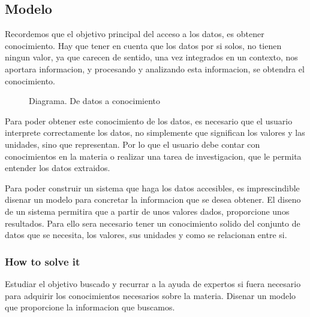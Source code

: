 \subsection{Modelo}

Recordemos que el objetivo principal del acceso a los datos, es obtener conocimiento. Hay que tener en 
cuenta que los datos por si solos, no tienen ningun valor, ya que carecen de sentido, una vez integrados en un contexto,
nos aportara informacion, y procesando y analizando esta informacion, se obtendra el conocimiento.\\
    
\begin{figure}[ht]
    \centering 
      \caption{Diagrama. De datos a conocimiento}
    \end{figure}
 
Para poder obtener este conocimiento de los datos, es necesario que el usuario interprete correctamente los datos, no
simplemente que significan los valores y las unidades, sino que representan. Por lo
que el usuario debe contar con conocimientos en la materia o realizar una tarea de investigacion, que le permita 
entender los datos extraidos. 

Para poder construir un sistema que haga los datos accesibles, es imprescindible disenar un modelo  para concretar la 
informacion que se desea obtener. El diseno de un sistema permitira que a partir de unos valores dados, proporcione unos resultados.
Para ello sera necesario tener un conocimiento solido del conjunto de datos que se necesita, los valores,
sus unidades y como se relacionan entre si.


\subsubsection{How to solve it} 
Estudiar el objetivo buscado y recurrar a la ayuda de expertos si fuera necesario para adquirir los conocimientos necesarios
sobre la materia. Disenar un modelo que proporcione la informacion que buscamos. 

